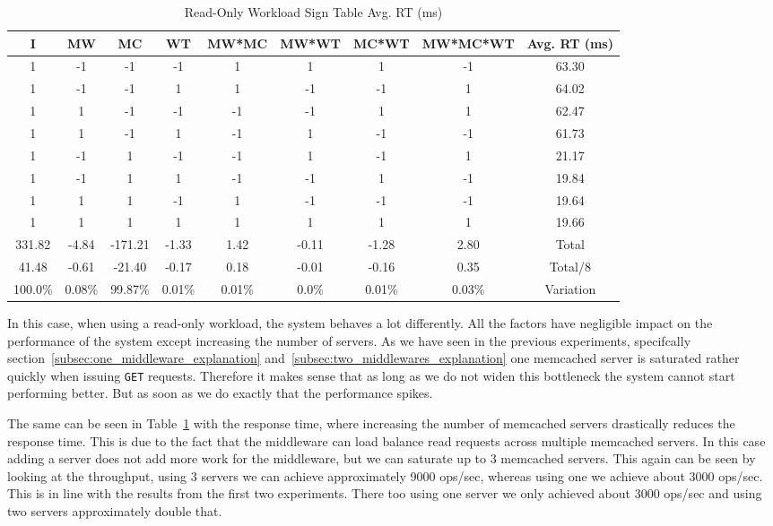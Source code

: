 \documentclass[11pt,a4paper]{article}
\begin{document}
%
\begin{table}[H]
\centering
\scriptsize{
\begin{tabular}{|c|ccccccc|c|}
\hline I & MW & MC & WT & MW*MC & MW*WT & MC*WT & MW*MC*WT & Avg. RT (ms)\\
\hline
1 & -1 & -1 & -1 & 1 & 1 & 1 & -1 & 63.30\\
1 & -1 & -1 & 1 & 1 & -1 & -1 & 1 & 64.02\\
1 & 1 & -1 & -1 & -1 & -1 & 1 & 1 & 62.47\\
1 & 1 & -1 & 1 & -1 & 1 & -1 & -1 & 61.73\\
1 & -1 & 1 & -1 & -1 & 1 & -1 & 1 & 21.17\\
1 & -1 & 1 & 1 & -1 & -1 & 1 & -1 & 19.84\\
1 & 1 & 1 & -1 & 1 & -1 & -1 & -1 & 19.64\\
1 & 1 & 1 & 1 & 1 & 1 & 1 & 1 & 19.66\\
\hline
331.82 & -4.84 & -171.21 & -1.33 & 1.42 & -0.11 & -1.28 & 2.80 & Total\\
41.48 & -0.61 & -21.40 & -0.17 & 0.18 & -0.01 & -0.16 & 0.35 & Total/8\\
100.0\% & 0.08\% & 99.87\% & 0.01\% & 0.01\% & 0.0\% & 0.01\% & 0.03\% & Variation\\
\hline
\end{tabular}
}
\caption{Read-Only Workload Sign Table Avg. RT (ms)}
\label{2k_get_rt}
\end{table}
%
In this case, when using a read-only workload, the system behaves a lot differently.
%
All the factors have negligible impact on the performance of the system except increasing the number of servers.
%
As we have seen in the previous experiments, specifcally section~\ref{subsec:one_middleware_explanation} and~\ref{subsec:two_middlewares_explanation} one memcached server is saturated rather quickly when issuing \texttt{GET} requests.
%
Therefore it makes sense that as long as we do not widen this bottleneck the system cannot start performing better.
%
But as soon as we do exactly that the performance spikes.
%
\par
%
The same can be seen in Table~\ref{2k_get_rt} with the response time, where increasing the number of memcached servers drastically reduces the response time.
%
This is due to the fact that the middleware can load balance read requests across multiple memcached servers.
%
In this case adding a server does not add more work for the middleware, but we can saturate up to 3 memcached servers.
%
This again can be seen by looking at the throughput, using 3 servers we can achieve approximately 9000 ops/sec, whereas using one we achieve about 3000 ops/sec.
%
This is in line with the results from the first two experiments.
%
There too using one server we only achieved about 3000 ops/sec and using two servers approximately double that.
%
\end{document}
